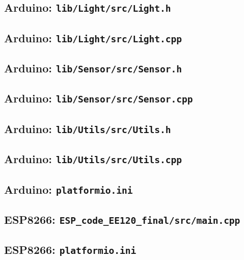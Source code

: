 \documentclass[11pt]{article}
\begin{document}
\subsection{Arduino: \texttt{lib/Light/src/Light.h}}


\subsection{Arduino: \texttt{lib/Light/src/Light.cpp}}


\subsection{Arduino: \texttt{lib/Sensor/src/Sensor.h}}


\subsection{Arduino: \texttt{lib/Sensor/src/Sensor.cpp}}


\subsection{Arduino: \texttt{lib/Utils/src/Utils.h}}


\subsection{Arduino: \texttt{lib/Utils/src/Utils.cpp}}


\subsection{Arduino: \texttt{platformio.ini}}


\subsection{ESP8266: \texttt{ESP\_code\_EE120\_final/src/main.cpp}}


\subsection{ESP8266: \texttt{platformio.ini}}

\end{document}
